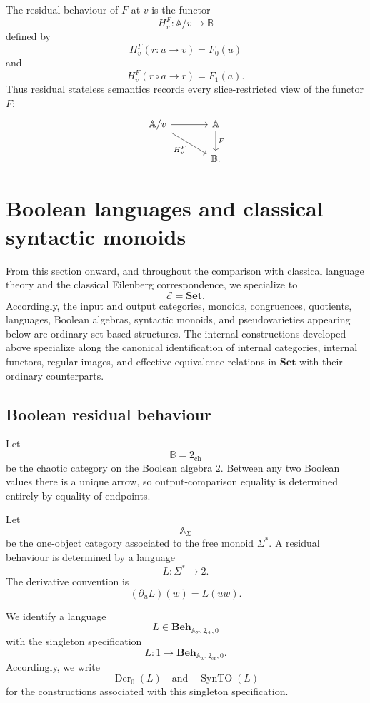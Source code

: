The residual behaviour of \(F\) at \(v\) is the functor
\[
    H_v^F:\mathbb A/v\to\mathbb B
\]
defined by
\[
    H_v^F(r:u\to v)=F_0(u)
\]
and
\[
    H_v^F(r\circ a\to r)=F_1(a).
\]
Thus residual stateless semantics records every slice-restricted view of the
functor \(F\):
\[
\begin{tikzcd}[column sep=large]
    \mathbb A/v
        \arrow[r]
        \arrow[dr, "H_v^F"']
    &
    \mathbb A
        \arrow[d, "F"]
    \\
    &
    \mathbb B.
\end{tikzcd}
\]

\section{Boolean languages and classical syntactic monoids}
\label{sec:to-boolean-classical}

From this section onward, and throughout the comparison with classical
language theory and the classical Eilenberg correspondence, we specialize to
\[
    \mathcal E=\mathbf{Set}.
\]
Accordingly, the input and output categories, monoids, congruences, quotients,
languages, Boolean algebras, syntactic monoids, and pseudovarieties appearing
below are ordinary set-based structures. The internal constructions developed
above specialize along the canonical identification of internal categories,
internal functors, regular images, and effective equivalence relations in
\(\mathbf{Set}\) with their ordinary counterparts.

\subsection{Boolean residual behaviour}
\label{subsec:to-boolean-residual-behaviour}

Let
\[
    \mathbb B=2_{\mathrm{ch}}
\]
be the chaotic category on the Boolean algebra \(2\). Between any two Boolean
values there is a unique arrow, so output-comparison equality is determined
entirely by equality of endpoints.

Let
\[
    \mathbb A_\Sigma
\]
be the one-object category associated to the free monoid \(\Sigma^*\). A
residual behaviour is determined by a language
\[
    L:\Sigma^*\to2.
\]
The derivative convention is
\[
    (\partial_uL)(w)=L(uw).
\]

We identify a language
\[
    L\in
    \mathbf{Beh}_{\mathbb A_\Sigma,2_{\mathrm{ch}},0}
\]
with the singleton specification
\[
    L:
    1\to
    \mathbf{Beh}_{\mathbb A_\Sigma,2_{\mathrm{ch}},0}.
\]
Accordingly, we write
\[
    \operatorname{Der}_0(L)
    \quad\text{and}\quad
    \operatorname{SynTO}(L)
\]
for the constructions associated with this singleton specification.

